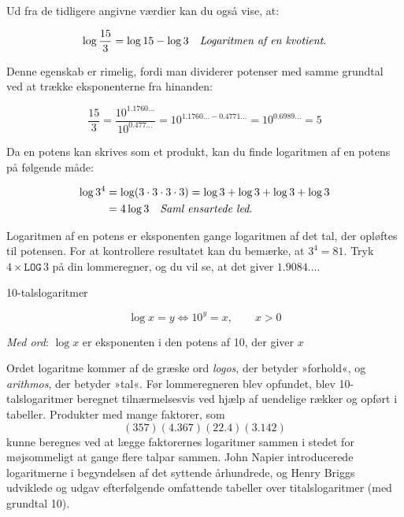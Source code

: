 Ud fra de tidligere angivne værdier kan du også vise, at:

\[
\log \frac{15}{3} = \log 15 - \log 3 \quad \text{\textit{Logaritmen af en kvotient}.}
\]

Denne egenskab er rimelig, fordi man dividerer potenser med samme grundtal ved at trække eksponenterne fra hinanden:

\[
\frac{15}{3} = \frac{10^{1.1760 \ldots}}{10^{0.477 \ldots}} = 10^{1.1760 \ldots - 0.4771 \ldots} = 10^{0.6989 \ldots} = 5
\]

Da en potens kan skrives som et produkt, kan du finde logaritmen af en potens på følgende måde:

\[
\begin{aligned}
\log 3^4 & = \log (3 \cdot 3 \cdot 3 \cdot 3) = \log 3 + \log 3 + \log 3 + \log 3 \\
& = 4 \log 3 \quad \text{\textit{Saml ensartede led}.}
\end{aligned}
\]

Logaritmen af en potens er eksponenten gange logaritmen af det tal, der opløftes til potensen. For at kontrollere resultatet kan du bemærke, at \(3^4 = 81\). Tryk \(4 \times \texttt{LOG}\,3\) på din lommeregner, og du vil se, at det giver \(1.9084 \ldots\).

\begin{definition}{10-talslogaritmer}

\[
\log x=y \iff 10^y=x, \qquad x>0
\]

\textit{Med ord}: $\log x$ er eksponenten i den potens af 10, der giver $x$   
\end{definition}

Ordet logaritme kommer af de græske ord \emph{logos}, der betyder »forhold«, og \emph{arithmos}, der betyder »tal«. Før lommeregneren blev opfundet, blev 10-talslogaritmer beregnet tilnærmelsesvis ved hjælp af uendelige rækker og opført i tabeller. Produkter med mange faktorer, som
\[
(357)(4.367)(22.4)(3.142)
\]
kunne beregnes ved at lægge faktorernes logaritmer sammen i stedet for møjsommeligt at gange flere talpar sammen. John Napier introducerede logaritmerne i begyndelsen af det syttende århundrede, og Henry Briggs udviklede og udgav efterfølgende omfattende tabeller over titalslogaritmer (med grundtal 10).

